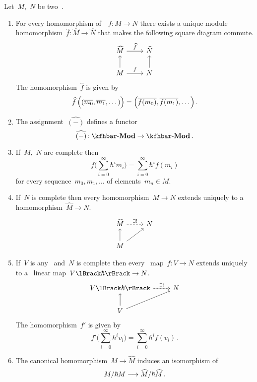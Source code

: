 \documentclass[a4paper, 11pt, oneside]{scrartcl}
\begin{document}
\begin{proposition}
  \label{properties of completions}
  Let~$M$,~$N$ be two~\modules{$\kfhbar$}.
  \begin{enumerate}
    \item
      For every homomorphism of~\modules{$\kfhbar$}~$f \colon M \to N$ there exists a unique module homomorphism~$\widehat{f} \colon \widehat{M} \to \widehat{N}$ that makes the following square diagram commute.
      \[
        \begin{tikzcd}
          \widehat{M}
          \arrow{r}[above]{\widehat{f}}
          &
          \widehat{N}
          \\
          M
          \arrow{u}
          \arrow{r}[above]{f}
          &
          N
          \arrow{u}
        \end{tikzcd}
      \]
      The homomorphism~$\widehat{f}$ is given by
      \[
        \widehat{f} \, \Bigl( (\overline{m_0}, \overline{m_1}, \dotsc) \Bigr)
        =
        \Bigl( \overline{f(m_0)}, \overline{f(m_1)}, \dotsc \Bigr) \,.
      \]
    \item
      The assignment~$\widehat{(-)}$ defines a functor
      \[
        \widehat{(-)}
        \colon
        \Mod{\kfhbar}
        \to
        \Mod{\kfhbar} \,.
      \]
    \item
      If~$M$,~$N$ are complete then
      \[
        f\Biggl( \sum_{i=0}^\infty \hbar^i m_i \Biggr)
        =
        \sum_{i=0}^\infty \hbar^i f(m_i)
      \]
      for every sequence~$m_0, m_1, \dotsc$ of elements~$m_n \in M$.
    \item
      If~$N$ is complete then every homomorphism~$M \to N$ extends uniquely to a homomorphism~$\widehat{M} \to N$.
      \[
        \begin{tikzcd}
          \widehat{M}
          \arrow[dashed]{r}[above]{\exists!}
          &
          N
          \\
          M
          \arrow{u}
          \arrow{ur}
          &
          {}
        \end{tikzcd}
      \]
    \item
      If~$V$ is any~\vectorspace{$\kf$} and~$N$ is complete then every~\linear{$\kf$} map~$f \colon V \to N$ extends uniquely to a~\linear{$\kfhbar$} linear map~$\power{V}{\hbar} \to N$.
      \[
        \begin{tikzcd}
          \power{V}{\hbar}
          \arrow[dashed]{r}[above]{\exists!}
          &
          N
          \\
          V
          \arrow{u}
          \arrow{ur}
          &
          {}
        \end{tikzcd}
      \]
      The homomorphism~$f'$ is given by
      \[
        f'\Biggl( \sum_{i=0}^\infty \hbar^i v_i \Biggr)
        =
        \sum_{i=0}^\infty \hbar^i f(v_i) \,.
      \]
    \item
      The canonical homomorphism~$M \to \widehat{M}$ induces an isomorphism of~\vectorspaces{$\kf$}
      \[
        M / \hbar M
        \longrightarrow
        \widehat{M} / \hbar \widehat{M} \,.
      \]
  \end{enumerate}
\end{proposition}
\end{document}
